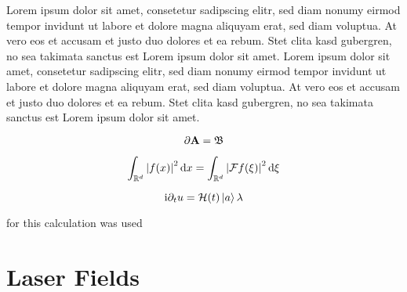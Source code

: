 Lorem ipsum dolor sit amet, consetetur sadipscing elitr, sed diam nonumy eirmod tempor invidunt ut labore et dolore magna aliquyam erat, sed diam voluptua. At vero eos et accusam et justo duo dolores et ea rebum. Stet clita kasd gubergren, no sea takimata sanctus est Lorem ipsum dolor sit amet. Lorem ipsum dolor sit amet, consetetur sadipscing elitr, sed diam nonumy eirmod tempor invidunt ut labore et dolore magna aliquyam erat, sed diam voluptua. At vero eos et accusam et justo duo dolores et ea rebum. Stet clita kasd gubergren, no sea takimata sanctus est Lorem ipsum dolor sit amet.

\begin{equation*}
    \partial \mathbf{A} = \mathfrak{B}
\end{equation*}

\medskip

\begin{equation}
    \int_{\mathbb{R}^d} {\left\vert f(x)\right\vert}^2 \, \mathrm{d} x = \int_{\mathbb{R}^d} {\left\vert\mathcal{F} f(\xi)\right\vert}^2 \, \mathrm{d} \xi
\end{equation}

\medskip

\begin{equation}
    \mathrm{i} \partial_t u = \mathcal{H}(t) \Ket{a} \lambda 
\end{equation}


for this calculation \cite{Park:18} was used



\section{Laser Fields}